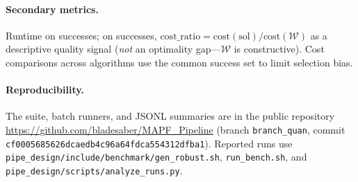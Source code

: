 \paragraph{Secondary metrics.}
Runtime on successes; on successes,
$\mathrm{cost\_ratio}=\mathrm{cost}(\mathrm{sol})/\mathrm{cost}(\mathcal{W})$
as a descriptive quality signal (\emph{not} an optimality gap---$\mathcal{W}$
is constructive). Cost comparisons across algorithms use the common success
set to limit selection bias.

\paragraph{Reproducibility.}
The suite, batch runners, and JSONL summaries are in the public repository
\url{https://github.com/bladesaber/MAPF_Pipeline}
(branch \texttt{branch\_quan}, commit \texttt{cf0005685626dcaedb4c96a64fdca554312dfba1}).
Reported runs use \texttt{pipe\_design/include/benchmark/gen\_robust.sh},
\texttt{run\_bench.sh}, and \texttt{pipe\_design/scripts/analyze\_runs.py}.
